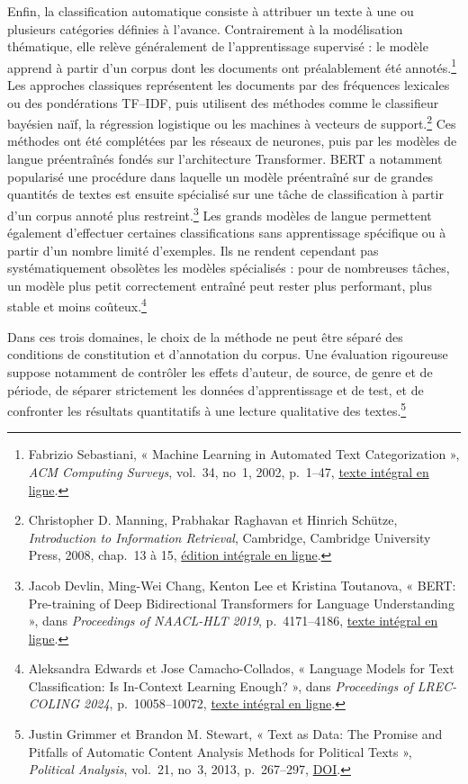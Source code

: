 Enfin, la classification automatique consiste à attribuer un texte à une ou plusieurs catégories définies à l’avance. Contrairement à la modélisation thématique, elle relève généralement de l’apprentissage supervisé : le modèle apprend à partir d’un corpus dont les documents ont préalablement été annotés.\footnote{Fabrizio Sebastiani, « Machine Learning in Automated Text Categorization », \emph{ACM Computing Surveys}, vol.~34, no~1, 2002, p.~1--47, \href{https://arxiv.org/abs/cs/0110053}{texte intégral en ligne}.} Les approches classiques représentent les documents par des fréquences lexicales ou des pondérations TF--IDF, puis utilisent des méthodes comme le classifieur bayésien naïf, la régression logistique ou les machines à vecteurs de support.\footnote{Christopher D. Manning, Prabhakar Raghavan et Hinrich Schütze, \emph{Introduction to Information Retrieval}, Cambridge, Cambridge University Press, 2008, chap.~13 à 15, \href{https://nlp.stanford.edu/IR-book/information-retrieval-book.html}{édition intégrale en ligne}.} Ces méthodes ont été complétées par les réseaux de neurones, puis par les modèles de langue préentraînés fondés sur l’architecture Transformer. BERT a notamment popularisé une procédure dans laquelle un modèle préentraîné sur de grandes quantités de textes est ensuite spécialisé sur une tâche de classification à partir d’un corpus annoté plus restreint.\footnote{Jacob Devlin, Ming-Wei Chang, Kenton Lee et Kristina Toutanova, « BERT: Pre-training of Deep Bidirectional Transformers for Language Understanding », dans \emph{Proceedings of NAACL-HLT 2019}, p.~4171--4186, \href{https://aclanthology.org/N19-1423/}{texte intégral en ligne}.} Les grands modèles de langue permettent également d’effectuer certaines classifications sans apprentissage spécifique ou à partir d’un nombre limité d’exemples. Ils ne rendent cependant pas systématiquement obsolètes les modèles spécialisés : pour de nombreuses tâches, un modèle plus petit correctement entraîné peut rester plus performant, plus stable et moins coûteux.\footnote{Aleksandra Edwards et Jose Camacho-Collados, « Language Models for Text Classification: Is In-Context Learning Enough? », dans \emph{Proceedings of LREC-COLING 2024}, p.~10058--10072, \href{https://aclanthology.org/2024.lrec-main.879/}{texte intégral en ligne}.}

Dans ces trois domaines, le choix de la méthode ne peut être séparé des conditions de constitution et d’annotation du corpus. Une évaluation rigoureuse suppose notamment de contrôler les effets d’auteur, de source, de genre et de période, de séparer strictement les données d’apprentissage et de test, et de confronter les résultats quantitatifs à une lecture qualitative des textes.\footnote{Justin Grimmer et Brandon M. Stewart, « Text as Data: The Promise and Pitfalls of Automatic Content Analysis Methods for Political Texts », \emph{Political Analysis}, vol.~21, no~3, 2013, p.~267--297, \href{https://doi.org/10.1093/pan/mps028}{DOI}.}
 
